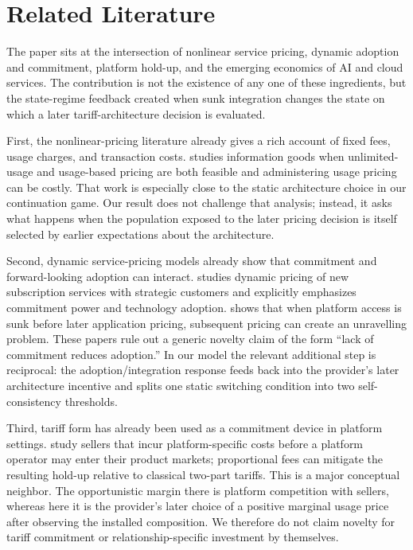 \section{Related Literature}\label{sec:literature}

The paper sits at the intersection of nonlinear service pricing, dynamic adoption and commitment, platform hold-up, and the emerging economics of AI and cloud services. The contribution is not the existence of any one of these ingredients, but the state-regime feedback created when sunk integration changes the state on which a later tariff-architecture decision is evaluated.

First, the nonlinear-pricing literature already gives a rich account of fixed fees, usage charges, and transaction costs. \citet{sundararajan2004} studies information goods when unlimited-usage and usage-based pricing are both feasible and administering usage pricing can be costly. That work is especially close to the static architecture choice in our continuation game. Our result does not challenge that analysis; instead, it asks what happens when the population exposed to the later pricing decision is itself selected by earlier expectations about the architecture.

Second, dynamic service-pricing models already show that commitment and forward-looking adoption can interact. \citet{penmetsa2015} studies dynamic pricing of new subscription services with strategic customers and explicitly emphasizes commitment power and technology adoption. \citet{gans2012} shows that when platform access is sunk before later application pricing, subsequent pricing can create an unravelling problem. These papers rule out a generic novelty claim of the form ``lack of commitment reduces adoption.'' In our model the relevant additional step is reciprocal: the adoption/integration response feeds back into the provider's later architecture incentive and splits one static switching condition into two self-consistency thresholds.

Third, tariff form has already been used as a commitment device in platform settings. \citet{mutherswismer2022} study sellers that incur platform-specific costs before a platform operator may enter their product markets; proportional fees can mitigate the resulting hold-up relative to classical two-part tariffs. This is a major conceptual neighbor. The opportunistic margin there is platform competition with sellers, whereas here it is the provider's later choice of a positive marginal usage price after observing the installed composition. We therefore do not claim novelty for tariff commitment or relationship-specific investment by themselves.

